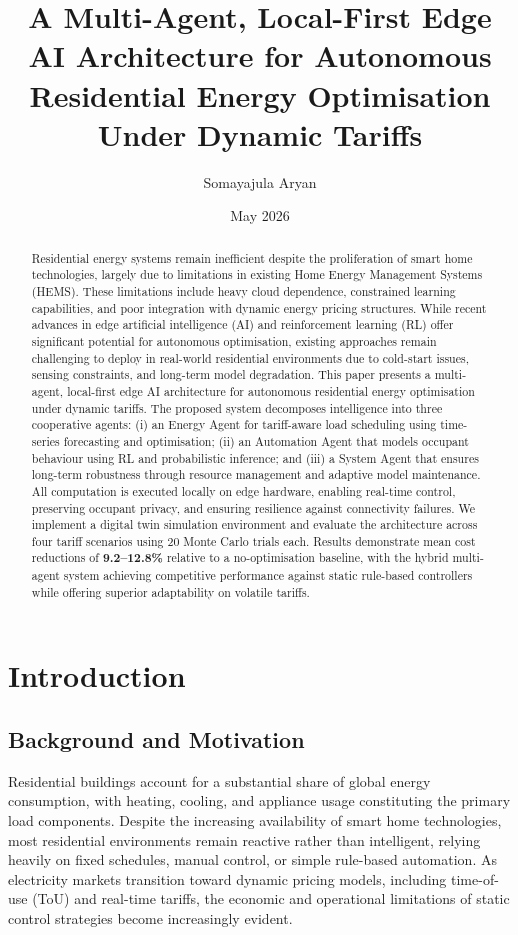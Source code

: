 \documentclass[11pt,a4paper]{article}
\title{A Multi-Agent, Local-First Edge AI Architecture for Autonomous Residential Energy Optimisation Under Dynamic Tariffs}
\author{Somayajula Aryan}
\date{May 2026}
\begin{document}
\maketitle
\thispagestyle{empty}
\newpage

\begin{abstract}
Residential energy systems remain inefficient despite the proliferation of smart home technologies, largely due to limitations in existing Home Energy Management Systems (HEMS). These limitations include heavy cloud dependence, constrained learning capabilities, and poor integration with dynamic energy pricing structures. While recent advances in edge artificial intelligence (AI) and reinforcement learning (RL) offer significant potential for autonomous optimisation, existing approaches remain challenging to deploy in real-world residential environments due to cold-start issues, sensing constraints, and long-term model degradation. This paper presents a multi-agent, local-first edge AI architecture for autonomous residential energy optimisation under dynamic tariffs. The proposed system decomposes intelligence into three cooperative agents: (i) an Energy Agent for tariff-aware load scheduling using time-series forecasting and optimisation; (ii) an Automation Agent that models occupant behaviour using RL and probabilistic inference; and (iii) a System Agent that ensures long-term robustness through resource management and adaptive model maintenance. All computation is executed locally on edge hardware, enabling real-time control, preserving occupant privacy, and ensuring resilience against connectivity failures. We implement a digital twin simulation environment and evaluate the architecture across four tariff scenarios using 20 Monte Carlo trials each. Results demonstrate mean cost reductions of \textbf{9.2--12.8\%} relative to a no-optimisation baseline, with the hybrid multi-agent system achieving competitive performance against static rule-based controllers while offering superior adaptability on volatile tariffs.
\end{abstract}
\newpage

\tableofcontents
\newpage

\section{Introduction}

\subsection{Background and Motivation}
Residential buildings account for a substantial share of global energy consumption, with heating, cooling, and appliance usage constituting the primary load components. Despite the increasing availability of smart home technologies, most residential environments remain reactive rather than intelligent, relying heavily on fixed schedules, manual control, or simple rule-based automation. As electricity markets transition toward dynamic pricing models, including time-of-use (ToU) and real-time tariffs, the economic and operational limitations of static control strategies become increasingly evident.
\end{document}
